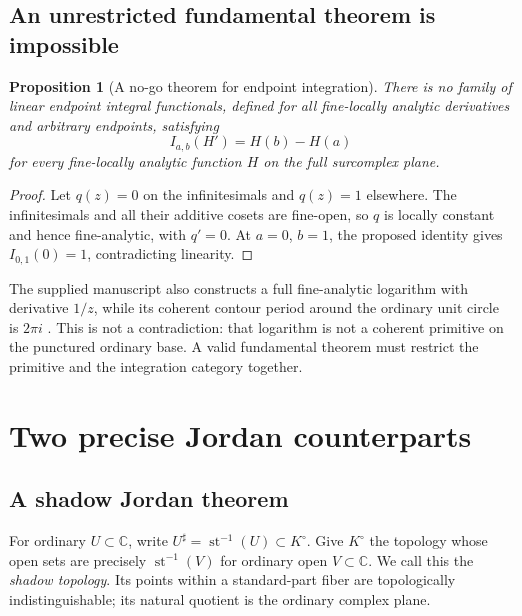 \documentclass[11pt,letterpaper]{article}
\newtheorem{proposition}[theorem]{Proposition}
\theoremstyle{definition}
\theoremstyle{remark}
\newcommand{\C}{\mathbb C}
\newcommand{\st}{\operatorname{st}}
\newcommand{\sh}{^{\sharp}}
\numberwithin{equation}{section}
\begin{document}
\subsection{An unrestricted fundamental theorem is impossible}
\begin{proposition}[A no-go theorem for endpoint integration]\label{prop:noFTC}
There is no family of linear endpoint integral functionals, defined for all fine-locally analytic derivatives and arbitrary endpoints, satisfying
\[
I_{a,b}(H')=H(b)-H(a)
\]
for every fine-locally analytic function $H$ on the full surcomplex plane.
\end{proposition}
\begin{proof}
Let $q(z)=0$ on the infinitesimals and $q(z)=1$ elsewhere. The infinitesimals and all their additive cosets are fine-open, so $q$ is locally constant and hence fine-analytic, with $q'=0$. At $a=0$, $b=1$, the proposed identity gives $I_{0,1}(0)=1$, contradicting linearity.
\end{proof}
The supplied manuscript also constructs a full fine-analytic logarithm with derivative $1/z$, while its coherent contour period around the ordinary unit circle is $2\pi i$ \cite[\S\S6,11]{SA}. This is not a contradiction: that logarithm is not a coherent primitive on the punctured ordinary base. A valid fundamental theorem must restrict the primitive and the integration category together.

\section{Two precise Jordan counterparts}\label{sec:jordan}
\subsection{A shadow Jordan theorem}
For ordinary $U\subset\C$, write $U\sh=\st^{-1}(U)\subset K^\circ$. Give $K^\circ$ the topology whose open sets are precisely $\st^{-1}(V)$ for ordinary open $V\subset\C$. We call this the \emph{shadow topology}. Its points within a standard-part fiber are topologically indistinguishable; its natural quotient is the ordinary complex plane.
\end{document}
